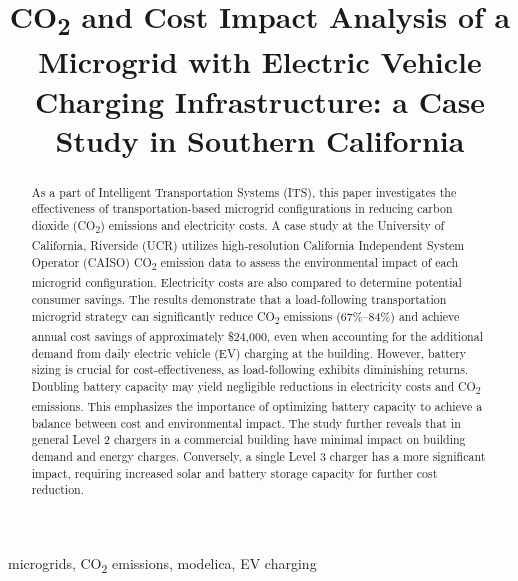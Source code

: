 \documentclass[conference]{IEEEtran}
\begin{document}
\title{CO\textsubscript{2} and Cost Impact Analysis of a Microgrid  with Electric Vehicle Charging Infrastructure: a Case Study in Southern California}

\author{
}
\maketitle

\begin{abstract}
	 As a part of Intelligent Transportation Systems (ITS), this paper investigates the effectiveness of transportation-based microgrid configurations in reducing carbon dioxide (CO\textsubscript{2}) emissions and electricity costs. A case study at the University of California, Riverside (UCR) utilizes high-resolution California Independent System Operator (CAISO) CO\textsubscript{2}  emission data to assess the environmental impact of each microgrid configuration. Electricity costs are also compared to determine potential consumer savings. The results demonstrate that a load-following transportation microgrid strategy can significantly reduce CO\textsubscript{2}  emissions (67\%–84\%) and achieve annual cost savings of approximately \$24,000, even when accounting for the additional demand from daily electric vehicle (EV) charging at the building. However, battery sizing is crucial for cost-effectiveness, as load-following exhibits diminishing returns. Doubling battery capacity may yield negligible reductions in electricity costs and CO\textsubscript{2}  emissions. This emphasizes the importance of optimizing battery capacity to achieve a balance between cost and environmental impact. The study further reveals that in general Level 2 chargers in a commercial building have minimal impact on building demand and energy charges. Conversely, a single Level 3 charger has a more significant impact, requiring increased solar and battery storage capacity for further cost reduction. %
\end{abstract}
\begin{IEEEkeywords}
microgrids, CO\textsubscript{2} emissions, modelica, EV charging
\end{IEEEkeywords}
\end{document}
